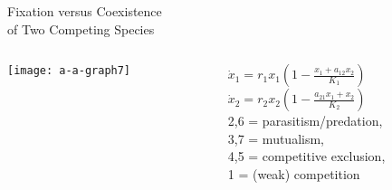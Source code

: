 \documentclass[dvipsnames]{beamer}
\begin{document}
\begin{frame}
\centering
{{\Huge Fixation versus Coexistence\\ 
\vspace{0.2cm}
of Two Competing Species}}
\begin{columns}
	\begin{column}{5.9cm}
		\vspace{-0.3cm}
		\begin{center}
			\texttt{[image: a-a-graph7]}
		\end{center}
	\end{column}
	\begin{column}{5.1cm}
		$\dot{x}_1 = r_1 x_1 \left( 1 - \frac{x_1 + a_{12} x_2}{K_1} \right)$ \\
		$\dot{x}_2 = r_2 x_2 \left( 1 - \frac{a_{21} x_1 + x_2}{K_2} \right)$ \\
		\vspace{0.1cm}
		2,6 = parasitism/predation, \\
		3,7 = mutualism, \\
		4,5 = competitive exclusion, \\
		1 = (weak) competition
	\end{column}
\end{columns}
\end{frame}
\end{document}
